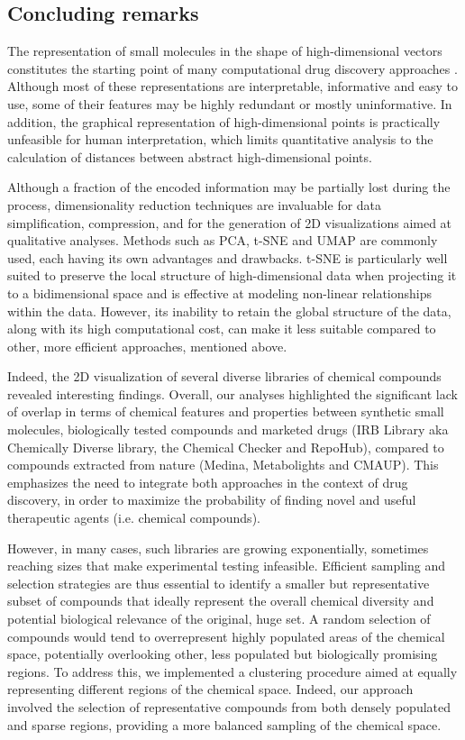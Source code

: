 \subsection{Concluding remarks}


The representation of small molecules in the shape of high-dimensional vectors constitutes the starting point of many computational drug discovery approaches \cite{cereto-massague_molecular_2015}. Although most of these representations are interpretable, informative and easy to use, some of their features may be highly redundant or mostly uninformative. In addition, the graphical representation of high-dimensional points is practically unfeasible for human interpretation, which limits quantitative analysis to the calculation of distances between abstract high-dimensional points.

Although a fraction of the encoded information may be partially lost during the process, dimensionality reduction techniques are invaluable for data simplification, compression, and for the generation of 2D visualizations aimed at qualitative analyses. Methods such as PCA, t-SNE and UMAP are commonly used, each having its own advantages and drawbacks. t-SNE is particularly well suited to preserve the local structure of high-dimensional data when projecting it to a bidimensional space and is effective at modeling non-linear relationships within the data. However, its inability to retain the global structure of the data, along with its high computational cost, can make it less suitable compared to other, more efficient approaches, mentioned above.

Indeed, the 2D visualization of several diverse libraries of chemical compounds revealed interesting findings. Overall, our analyses highlighted the significant lack of overlap in terms of chemical features and properties between synthetic small molecules, biologically tested compounds and marketed drugs (IRB Library aka Chemically Diverse library, the Chemical Checker and RepoHub), compared to compounds extracted from nature (Medina, Metabolights and CMAUP). This emphasizes the need to integrate both approaches in the context of drug discovery, in order to maximize the probability of finding novel and useful therapeutic agents (i.e. chemical compounds).

However, in many cases, such libraries are growing exponentially, sometimes reaching sizes that make experimental testing infeasible. Efficient sampling and selection strategies are thus essential to identify a smaller but representative subset of compounds that ideally represent the overall chemical diversity and potential biological relevance of the original, huge set. A random selection of compounds would tend to overrepresent highly populated areas of the chemical space, potentially overlooking other, less populated but biologically promising regions. To address this, we implemented a clustering procedure aimed at equally representing different regions of the chemical space. Indeed, our approach involved the selection of representative compounds from both densely populated and sparse regions, providing a more balanced sampling of the chemical space.

